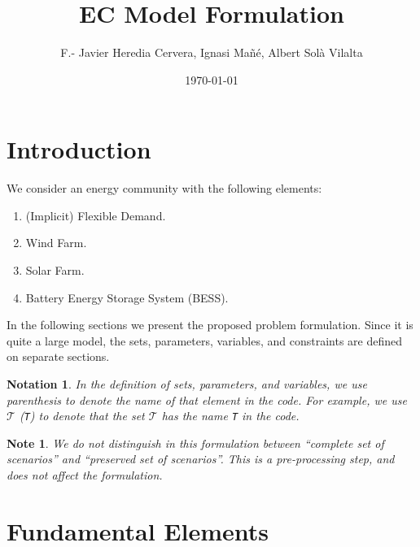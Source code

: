 \documentclass{article}
\title{EC Model Formulation}
\author{F.- Javier Heredia Cervera, Ignasi Mañé, Albert Sol\`a Vilalta}
\date{\today}
\newtheorem{notation}{Notation}[section]
\newtheorem{note}{Note}[section]
\begin{document}
\maketitle

\section{Introduction}

We consider an energy community with the following elements:
\begin{enumerate}
	\item (Implicit) Flexible Demand.
	\item Wind Farm.
	\item Solar Farm.
	\item Battery Energy Storage System (BESS).
\end{enumerate}

In the following sections we present the proposed problem formulation. Since it is quite a large model, the sets, parameters, variables, and constraints are defined on separate sections.

\begin{notation}
	In the definition of sets, parameters, and variables, we use parenthesis to denote the name of that element in the code. For example, we use $\mathcal{T}$ (\verb|T|) to denote that the set $\mathcal{T}$ has the name \verb|T| in the code.  
\end{notation}

\begin{note} \label{NOTE:ScenarioTreatment}
	We do not distinguish in this formulation between ``complete set of scenarios'' and ``preserved set of scenarios''. This is a pre-processing step, and does not affect the formulation. 
\end{note}

\section{Fundamental Elements}
\label{SEC:FundamentalElements}
\end{document}
